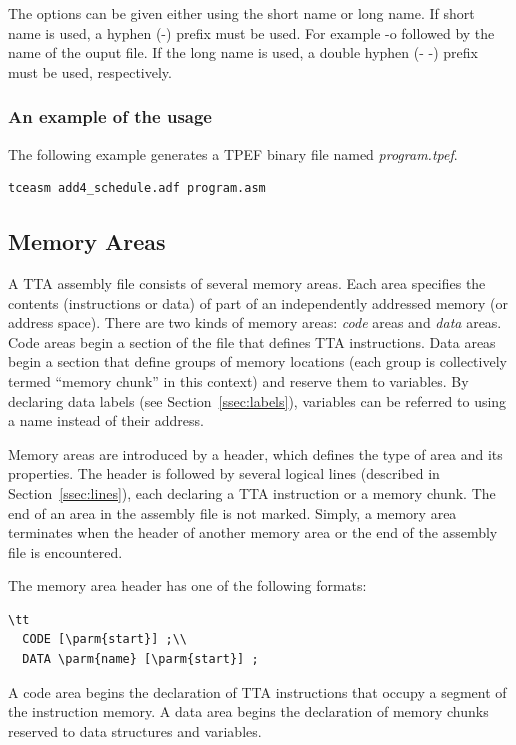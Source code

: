 \documentclass[twoside]{tceusermanual}
\begin{document}
The options can be given either using the short name or long name. If
short name is used, a hyphen (-) prefix must be used. For example -o
followed by the name of the ouput file. If the long name is used, a
double hyphen (- -) prefix must be used, respectively.

\subsubsection{An example of the usage}

The following example generates a TPEF binary file named \emph{program.tpef}.
 
\begin{verbatim}
tceasm add4_schedule.adf program.asm
\end{verbatim}

\subsection{Memory Areas}

A TTA assembly file consists of several memory areas. Each area specifies
the contents (instructions or data) of part of an independently addressed
memory (or address space). There are two kinds of memory areas: \emph{code}
areas and \emph{data} areas. Code areas begin a section of the file that
defines TTA instructions.  Data areas begin a section that define groups of
memory locations (each group is collectively termed ``memory chunk'' in this
context) and reserve them to variables. By declaring data labels (see
Section~\ref{ssec:labels}), variables can be referred to using a name
instead of their address.

Memory areas are introduced by a header, which defines the type of area and
its properties. The header is followed by several logical lines (described
in Section~\ref{ssec:lines}), each declaring a TTA instruction or a memory
chunk.  The end of an area in the assembly file is not marked. Simply, a
memory area terminates when the header of another memory area or the end of
the assembly file is encountered.

The memory area header has one of the following formats:
\begin{verbatim}\tt
  CODE [\parm{start}] ;\\
  DATA \parm{name} [\parm{start}] ;
\end{verbatim}

A code area begins the declaration of TTA instructions that occupy a segment
of the instruction memory. A data area begins the declaration of memory
chunks reserved to data structures and variables.
\end{document}
